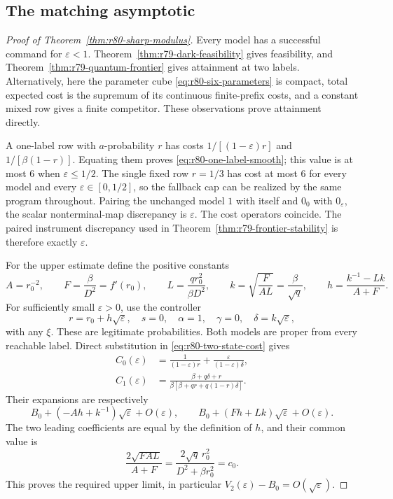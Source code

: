 \subsection{The matching asymptotic}

\begin{proof}[Proof of Theorem~\ref{thm:r80-sharp-modulus}]
Every model has a successful command for $\varepsilon<1$.
Theorem~\ref{thm:r79-dark-feasibility} gives feasibility, and
Theorem~\ref{thm:r79-quantum-frontier} gives attainment at two
labels.  Alternatively, here the parameter cube
\eqref{eq:r80-six-parameters} is compact, total expected cost is
the supremum of its continuous finite-prefix costs, and a
constant mixed row gives a finite competitor.  These observations
prove attainment directly.

A one-label row with $a$-probability $r$ has costs
$1/[(1-\varepsilon)r]$ and $1/[\beta(1-r)]$.
Equating them proves \eqref{eq:r80-one-label-smooth}; this value
is at most $6$ when $\varepsilon\le1/2$.  The single fixed row
$r=1/3$ has cost at most $6$ for every model and every
$\varepsilon\in[0,1/2]$, so the fallback cap can be realized by
the same program throughout.  Pairing the unchanged model $1$
with itself and $0_0$ with $0_\varepsilon$, the scalar
nonterminal-map discrepancy is $\varepsilon$.  The cost
operators coincide.  The paired instrument discrepancy used in
Theorem~\ref{thm:r79-frontier-stability} is therefore exactly
$\varepsilon$.

For the upper estimate define the positive constants
\begin{equation}\label{eq:r80-leading-coefficients}
 A=r_0^{-2},\qquad
 F=\frac{\beta}{D^2}=f'(r_0),\qquad
 L=\frac{qr_0^2}{\beta D^2},\qquad
 k=\sqrt{\frac{F}{AL}}=\frac{\beta}{\sqrt q},\qquad
 h=\frac{k^{-1}-Lk}{A+F}.
\end{equation}
For sufficiently small $\varepsilon>0$, use the controller
\begin{equation}\label{eq:r80-asymptotic-controller}
 r=r_0+h\sqrt\varepsilon,\quad s=0,\quad
 \alpha=1,\quad\gamma=0,\quad
 \delta=k\sqrt\varepsilon,
\end{equation}
with any $\xi$.  These are legitimate probabilities.  Both
models are proper from every reachable label.  Direct substitution
in \eqref{eq:r80-two-state-cost} gives
\begin{align}
 C_0(\varepsilon)
   &=\frac1{(1-\varepsilon)r}
                 +\frac{\varepsilon}{(1-\varepsilon)\delta},
                       \label{eq:r80-upper-cost-zero}\\
 C_1(\varepsilon)
   &=\frac{\beta+q\delta+r}
        {\beta[\beta+qr+q(1-r)\delta]}.
                       \label{eq:r80-upper-cost-one}
\end{align}
Their expansions are respectively
\[
 B_0+(-Ah+k^{-1})\sqrt\varepsilon+O(\varepsilon),
 \qquad
 B_0+(Fh+Lk)\sqrt\varepsilon+O(\varepsilon).
\]
The two leading coefficients are equal by the definition of $h$,
and their common value is
\[
 \frac{2\sqrt{FAL}}{A+F}
        =\frac{2\sqrt q\,r_0^2}{D^2+\beta r_0^2}=c_0.
\]
This proves the required upper limit, in particular
$V_2(\varepsilon)-B_0=O(\sqrt\varepsilon)$.


\end{proof}
